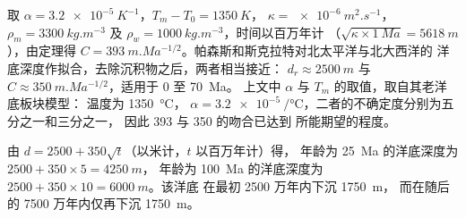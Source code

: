 取 $\alpha = \qty{3.2e-5}{K^{-1}}$，$T_m - T_0 = \qty{1350}{K}$，
$\kappa = \qty{e-6}{m^2.s^{-1}}$，$\rho_m = \qty{3300}{kg.m^{-3}}$ 及
$\rho_w = \qty{1000}{kg.m^{-3}}$，时间以百万年计
（$\sqrt{\kappa\times\qty{1}{Ma}} = \qty{5618}{m}$），由定理得
$C = \qty{393}{m.Ma^{-1/2}}$。帕森斯和斯克拉特对北太平洋与北大西洋的
洋底深度作拟合，去除沉积物之后，两者相当接近：
$d_r \approx \qty{2500}{m}$ 与
$C \approx \qty{350}{m.Ma^{-1/2}}$，适用于 0 至 \qty{70}{Ma}。
上文中 $\alpha$ 与 $T_m$ 的取值，取自其老洋底板块模型：
温度为 \qty{1350}{\degreeCelsius}，
$\alpha = \qty{3.2e-5}{\per\degreeCelsius}$，二者的不确定度分别为五分之一和三分之一，
因此 393 与 350 的吻合已达到
所能期望的程度。

\begin{example}\label{ex:b1:rifts-ridges-margins:depths}
由 $d = 2500 + 350\sqrt t$（以米计，$t$ 以百万年计）得，
年龄为 \qty{25}{Ma} 的洋底深度为 $2500 + 350\times5 = \qty{4250}{m}$，
年龄为 \qty{100}{Ma} 的洋底深度为 $2500 + 350\times10 = \qty{6000}{m}$。该洋底
在最初 2500 万年内下沉 \qty{1750}{m}，
而在随后的 7500 万年内仅再下沉 \qty{1750}{m}。
\end{example}

